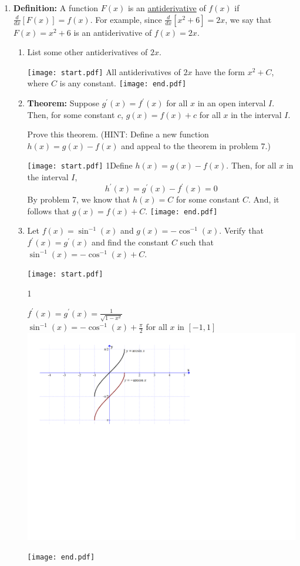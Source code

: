 \documentclass[12pt]{article}
\begin{document}
\begin{enumerate}
\item {\bf Definition:} A function $F(x)$ is an \underline{antiderivative} of $f(x)$ if $\frac{d}{dx}\left[F(x)\right]=f(x)$.  For example, since $\frac{d}{dx}\left[x^2+6\right]=2x$, we say that $F(x)=x^2+6$ is an antiderivative of $f(x)=2x$.

\begin{enumerate}

\item List some other antiderivatives of $2x$.

\texttt{[image: start.pdf]}
{{All antiderivatives of $2x$ have the form $x^2+C$, where $C$ is any constant.}}
\texttt{[image: end.pdf]}


\item {\bf Theorem:} Suppose $g^{\prime}(x)=f^{\prime}(x)$ for all $x$ in an open interval $I$.  Then, for some constant $c$, $g(x)=f(x)+c$ for all $x$ in the interval $I$.

Prove this theorem.  (HINT: Define a new function $h(x)=g(x)-f(x)$ and appeal to the theorem in problem 7.)

\texttt{[image: start.pdf]}
{{{1\linewidth}{Define $h(x)=g(x)-f(x)$.  Then, for all $x$ in the interval $I$,
$$h^{\prime}(x)=g^{\prime}(x)-f^{\prime}(x)=0$$
By problem 7, we know that $h(x)=C$ for some constant $C$. And, it follows that $g(x)=f(x)+C$.
}}}
\texttt{[image: end.pdf]}


\newpage

\item Let $f(x)=\sin^{-1}(x)$ and $g(x)=-\cos^{-1}(x)$.  Verify that $f^{\prime}(x)=g^{\prime}(x)$ and find the constant $C$ such that $\sin^{-1}(x)=-\cos^{-1}(x)+C$.

\texttt{[image: start.pdf]}
{{{1\linewidth}{\begin{center}$f^{\prime}(x)=g^{\prime}(x)=\frac{1}{\sqrt{1-x^2}}$\\
$\sin^{-1}(x)=-\cos^{-1}(x)+\frac{\pi}{2}$ for all $x$ in $[-1,1]$
\includegraphics[scale=0.5]{antiderivative.pdf}
\end{center}}}}
\texttt{[image: end.pdf]}


\end{enumerate}

\end{enumerate}
\end{document}
